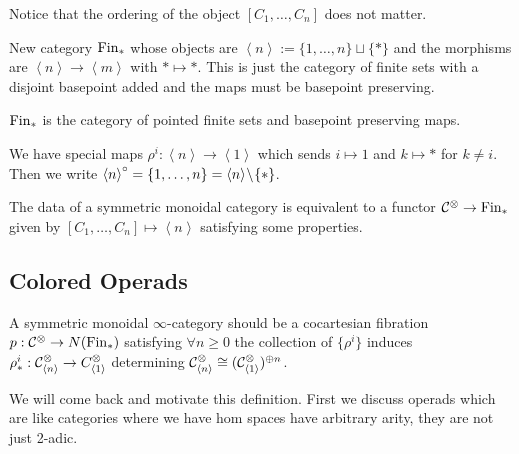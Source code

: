 \documentclass[12pt]{article}
\begin{document}
\begin{rmk}
Notice that the ordering of the object $[C_1, \dots, C_n]$ does not matter. 
\end{rmk}

\begin{defn}
New category $\mathrm{Fin}_*$ whose objects are $\left< n \right> := \{ 1, \dots, n \} \sqcup \{ * \}$ and the morphisms are $\left< n \right> \to \left< m \right>$ with $* \mapsto *$. This is just the category of finite sets with a disjoint basepoint added and the maps must be basepoint preserving. 
\end{defn}

\begin{rmk}
$\mathrm{Fin}_*$ is the category of pointed finite sets and basepoint preserving maps. 
\end{rmk}

\begin{defn}
We have special maps $\rho^i : \left< n \right> \to \left< 1 \right>$ which sends $i \mapsto 1$ and $k \mapsto *$ for $k \neq i$. Then we write $\left< n \right>^\circ = \{1, \dots, n\} = \left< n \right> \! \setminus \! \{ * \}$.
\end{defn}

\begin{rmk}
The data of a symmetric monoidal category is equivalent to a functor $\mathcal{C}^\otimes \to \mathrm{Fin}_*$ given by $[C_1, \dots, C_n] \mapsto \left< n \right>$ satisfying some properties. 
\end{rmk}

\subsection{Colored Operads}

\begin{defn}
A symmetric monoidal $\infty$-category should be a cocartesian fibration $p : \mathcal{C}^\otimes \to N(\mathrm{Fin}_*)$ satisfying $\forall n \ge 0$ the collection of $\{ \rho^i \}$ induces $\rho^i_* : \mathcal{C}_{\left< n \right>}^{\otimes} \to C^{\otimes}_{\left< 1 \right>}$ determining $\mathcal{C}^{\otimes}_{\left< n \right>} \cong (\mathcal{C}_{\left< 1 \right>}^{\otimes})^{\oplus n}$.
\end{defn}

\begin{rmk}
We will come back and motivate this definition. First we discuss operads which are like categories where we have hom spaces have arbitrary arity, they are not just 2-adic.
\end{rmk}
\end{document}
